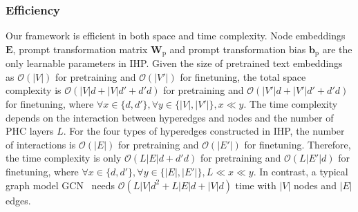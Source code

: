 \subsubsection{Efficiency}
Our framework is efficient in both space and time complexity. 
Node embeddings $\mathbf{E}$, prompt transformation matrix $\mathbf{W}_\text{p}$ and prompt transformation bias $\mathbf{b}_\text{p}$ are the only learnable parameters in IHP. 
Given the size of pretrained text embeddings as $\mathcal{O}(|V|)$ for pretraining and $\mathcal{O}(|V'|)$ for finetuning, the total space complexity is $\mathcal{O}(|V|d+|V|d'+d'd)$ for pretraining and $\mathcal{O}(|V'|d+|V'|d'+d'd)$ for finetuning, where $\forall x\in\{d,d'\},\forall y\in\{|V|,|V'|\}, x\ll y$. 
The time complexity depends on the interaction between hyperedges and nodes and the number of PHC layers $L$. 
For the four types of hyperedges constructed in IHP, the number of interactions is $\mathcal{O}(|E|)$ for pretraining and $\mathcal{O}(|E'|)$ for finetuning. 
Therefore, the time complexity is only $\mathcal{O}(L|E|d+d'd)$ for pretraining and $\mathcal{O}(L|E'|d)$ for finetuning, where $\forall x\in\{d,d'\},\forall y\in\{|E|,|E'|\}, L\ll x\ll y$. 
In contrast, a typical graph model GCN~\cite{GCN16} needs $\mathcal{O}(L|V|d^2+L|E|d+|V|d)$ time with $|V|$ nodes and $|E|$ edges.

\begin{table}
\caption{Statistics of datasets for IHP.}\label{tab:dataset_ihp}
\end{table}

